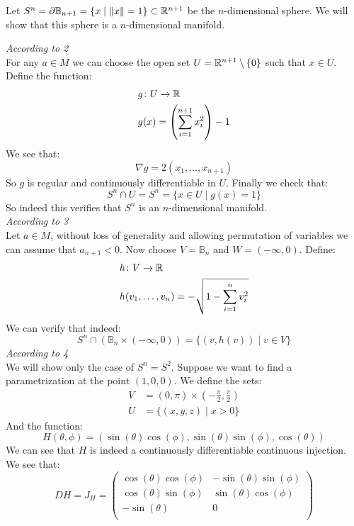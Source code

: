 \documentclass[11pt,a4paper]{article}
\begin{document}
	\begin{example}
		Let $S^n = \partial \mathbb{B}_{n+1} = \{x \mid \|x\| = 1\} \subset 
		\mathbb{R}^{n+1}$ be the $n$-dimensional sphere. We will show that this
		sphere is a $n$-dimensional manifold.
	\end{example}
	\noindent
	\emph{According to 2} \\
	For any $a \in M$ we can choose the open set 
	$U = \mathbb{R}^{n+1} \setminus \{0\}$ such that $x \in U$. Define the function:
	\begin{align*}
		&g \colon U \to \mathbb{R} \\
		&g(x) = \left(\sum_{i=1}^{n+1}{x_i^2}\right) - 1
	\end{align*}
	We see that:
	\[
		\nabla g = 2(x_1,\dots,x_{n+1})
	\]
	So $g$ is regular and continuously differentiable in $U$. Finally we
	check that:
	\[
		S^n \cap U = S^n = \{x \in U \mid g(x) = 1\}
	\]
	So indeed this verifies that $S^n$ is an $n$-dimensional manifold. \\
	\noindent
	\emph{According to 3} \\
	Let $a \in M$, without loss of generality and allowing permutation
	of variables we can assume that $a_{n+1} < 0$. Now choose 
	$V = \mathbb{B}_n$ and $W = (-\infty,0)$. Define:
	\begin{align*}
		&h \colon V \to \mathbb{R} \\
		&h(v_1,\dots,v_n) = - \sqrt{1 - \sum_{i=1}^{n}{v_i^2}}
	\end{align*}
	We can verify that indeed:
	\[
		S^n \cap (\mathbb{B}_n \times (-\infty,0)) = \{(v,h(v)) \mid v \in V\}
	\]
	\emph{According to 4} \\
	We will show only the case of $S^n = S^2$. Suppose we want to find
	a parametrization at the point $(1,0,0)$. We define the sets:
	\begin{align*}
		V &= (0,\pi) \times \left(-\frac{\pi}{2}, \frac{\pi}{2}\right) \\
		U &= \{(x,y,z) \mid x > 0\}
	\end{align*}
	And the function:
	\[
		H(\theta, \phi) = 
		(\sin(\theta)\cos(\phi),\sin(\theta)\sin(\phi),\cos(\theta))
	\]
	We can see that $H$ is indeed a continuously differentiable continuous
	injection. We see that:
	\[
		DH = J_H = \begin{pmatrix}
					\cos(\theta)\cos(\phi) & -\sin(\theta)\sin(\phi)\\
					\cos(\theta)\sin(\phi) & \sin(\theta)\cos(\phi)\\
					-\sin(\theta) & 0\\
					\end{pmatrix}
	\]
\end{document}
